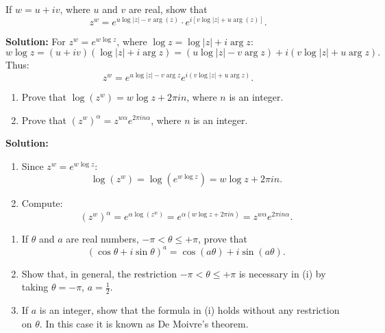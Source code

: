 \begin{problembox}
If \( w = u + iv \), where \( u \) and \( v \) are real, show that
\[
z^w = e^{u \log |z| - v \arg(z)} \cdot e^{i[v \log |z| + u \arg(z)]}.
\]
\end{problembox}

\textbf{Solution:}
For \( z^w = e^{w \log z} \), where \( \log z = \log |z| + i \arg z \):
\[
w \log z = (u + iv)(\log |z| + i \arg z) = (u \log |z| - v \arg z) + i(v \log |z| + u \arg z).
\]
Thus:
\[
z^w = e^{u \log |z| - v \arg z} e^{i(v \log |z| + u \arg z)}.
\]

\begin{problembox}
\begin{enumerate}[label=\alph*)]
\item Prove that \( \log(z^w) = w \log z + 2\pi i n \), where \( n \) is an integer.
\item Prove that \( (z^w)^\alpha = z^{w\alpha} e^{2\pi i n \alpha} \), where \( n \) is an integer.
\end{enumerate}
\end{problembox}

\textbf{Solution:}
\begin{enumerate}[label=\alph*)]
\item Since \( z^w = e^{w \log z} \):
\[
\log(z^w) = \log(e^{w \log z}) = w \log z + 2\pi i n.
\]
\item Compute:
\[
(z^w)^\alpha = e^{\alpha \log(z^w)} = e^{\alpha(w \log z + 2\pi i n)} = z^{w\alpha} e^{2\pi i n \alpha}.
\]
\end{enumerate}

\begin{problembox}
\begin{enumerate}[label=\roman*)]
\item If \( \theta \) and \( a \) are real numbers, \( -\pi < \theta \leq +\pi \), prove that
\[
(\cos \theta + i \sin \theta)^a = \cos(a\theta) + i \sin(a\theta).
\]
\item Show that, in general, the restriction \( -\pi < \theta \leq +\pi \) is necessary in (i) by taking \( \theta = -\pi \), \( a = \tfrac{1}{2} \).
\item If \( a \) is an integer, show that the formula in (i) holds without any restriction on \( \theta \). In this case it is known as De Moivre’s theorem.
\end{enumerate}
\end{problembox}

